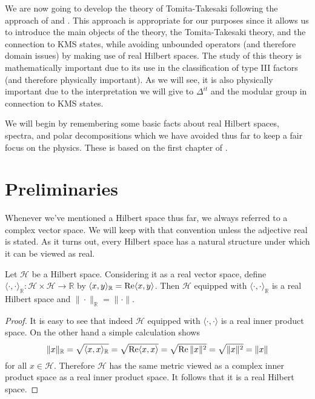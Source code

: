We are now going to develop the theory of Tomita-Takesaki following the approach of \cite{Duvenhage1999} and \cite{Rieffel1977}. This approach is appropriate for our purposes since it allows us to introduce the main objects of the theory, the Tomita-Takesaki theory, and the connection to KMS states, while avoiding unbounded operators (and therefore domain issues) by making use of real Hilbert spaces. The study of this theory is mathematically important due to its use in the classification of type III factors (and therefore physically important). As we will see, it is also physically important due to the interpretation we will give to $\Delta^{it}$ and the modular group in connection to KMS states.

We will begin by remembering some basic facts about real Hilbert spaces, spectra, and polar decompositions which we have avoided thus far to keep a fair focus on the physics. These is based on the first chapter of \cite{Duvenhage1999}.

\section{Preliminaries}

Whenever we've mentioned a Hilbert space thus far, we always referred to a complex vector space. We will keep with that convention unless the adjective real is stated. As it turns out, every Hilbert space has a natural structure under which it can be viewed as real.

\begin{theorem}
Let $\mathcal{H}$ be a Hilbert space. Considering it as a real vector space, define $\langle \cdot,\cdot \rangle_\mathbb{R}:\mathcal{H}\times\mathcal{H}\rightarrow\mathbb{R}$ by $\langle x,y\rangle_\mathbb{R}=\operatorname{Re}\langle x,y\rangle$. Then $\mathcal{H}$ equipped with $\langle\cdot,\cdot\rangle_\mathbb{R}$ is a real Hilbert space and $\|\cdot\|_\mathbb{R}=\|\cdot\|$.
\end{theorem}

\begin{proof}
It is easy to see that indeed $\mathcal{H}$ equipped with $\langle\cdot,\cdot\rangle$ is a real inner product space. On the other hand a simple calculation shows
\begin{equation}
\|x\|_\mathbb{R}=\sqrt{\langle x,x\rangle_\mathbb{R}}=\sqrt{\operatorname{Re}\langle x,x\rangle}=\sqrt{\operatorname{Re}\|x\|^2}=\sqrt{\|x\|^2}=\|x\|
\end{equation}
for all $x\in\mathcal{H}$. Therefore $\mathcal{H}$ has the same metric viewed as a complex inner product space as a real inner product space. It follows that it is a real Hilbert space.
\end{proof}

